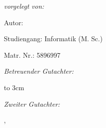 \documentclass
[
	12pt, %
	a4paper, %
	twoside, %
	openany, %
	chapterprefix, %
	listof=totoc, %
]{scrbook}
\newcommand*{\autor}[1]{\def\autor{#1}}
\newcommand*{\gutachterEins}[1]{\def\gutachterEins{#1}}
\newcommand*{\gutachterZwei}[1]{\def\gutachterZwei{#1}}
\newcommand*{\abteilung}[1]{\def\abteilung{#1}}
\newcommand*{\department}[1]{\def\department{#1}}
\newcommand*{\ort}[1]{\def\ort{#1}}
\newcommand*{\datum}[1]{\def\datum{#1}}
\begin{document}
\begin{titlepage}
\vfill

\begin{minipage}[t]{0.5\textwidth}
  \begin{flushleft}
    {\normalsize\itshape vorgelegt von:\par}
    {\normalsize Autor: \autor\par}
    {\normalsize Studiengang: Informatik (M. Sc.) \par}
    {\normalsize Matr. Nr.: 5896997}
  \end{flushleft}
\end{minipage}
\begin{minipage}[t]{0.4\textwidth}
  \begin{flushright}
    {\normalsize\itshape Betreuender Gutachter:\par}
    {\normalsize\gutachterEins}
    \hbox to 3cm{}%

    {\normalsize\itshape Zweiter Gutachter:\par}
    {\normalsize\gutachterZwei}
  \end{flushright}
\end{minipage}

\vfill

{\normalsize\abteilung\par}
{\normalsize\department\par}
\vspace{1cm}
{\normalsize\ort{}, \datum\par}
\end{titlepage}
\makeatother








\setcounter{page}{0}
\tableofcontents

\listoffigures
\listoftables
\lstlistoflistings
 
 


\mainmatter




\end{document}
